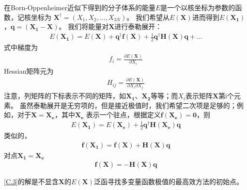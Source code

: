 在Born-Oppenheimer近似下得到的分子体系的能量$E$是一个以核坐标为参数的函数，记核坐标为
$\mathbf{X}^{\dagger}=(X_1,X_2,\dots,X_{3N})$。
我们希望从$E(\mathbf{X})$进而得到$E(\mathbf{X_1})$，$\mathbf{q=(X_1-X)}$。
我们将能量对$\mathbf{X}$进行泰勒展开：
\begin{align}
	\label{C.1}
	E(\mathbf{X_1})=E(\mathbf{X})+\mathbf{q}^{\dagger}\mathbf{f(X)}
                    +\frac{1}{2}\mathbf{q}^{\dagger}\mathbf{H(X)}\mathbf{q}+\dots
\end{align}
式中梯度为
\begin{align}
	f_i=\frac{\partial E(\mathbf{X})}{\partial X_i}
    \nonumber
\end{align}
Hessian矩阵元为
\begin{align}
	H_{ij}=\frac{\partial E(\mathbf{X})}{\partial X_i\partial X_j}
    \nonumber
\end{align}
注意，列矩阵的下标表示不同的矩阵，如$\mathbf{X_1}$、$\mathbf{X_2}$等等；而$X_i$表示矩阵$\mathbf{X}$第i个元素。
虽然泰勒展开是无穷项的，但是接近极值时，我们希望二次项是足够的；例如，对于$\mathbf{X}=\mathbf{X_e}$，其中$\mathbf{X_e}$
表示一个驻点，根据定义$\mathbf{f(X_e)=0}$，则
\begin{align}
	\nonumber
	E(\mathbf{X_1})=E(\mathbf{X_e})+\frac{1}{2}\mathbf{q}^{\dagger}\mathbf{H(X_e)}\mathbf{q}
\end{align}
类似的，
\begin{align}
	\label{C.2}
	\mathbf{f(X_1)}=\mathbf{f(X)}+\mathbf{H(X)}\mathbf{q}
\end{align}
对点$\mathbf{X_1}=\mathbf{X_e}$
\begin{align}
	\label{C.3}
	\mathbf{f(X)}=-\mathbf{H(X)}\mathbf{q}
\end{align}

\autoref{C.3}的解是不显含$\mathbf{X}$的$E(\mathbf{X})$泛函寻找多变量函数极值的最高效方法的初始点。